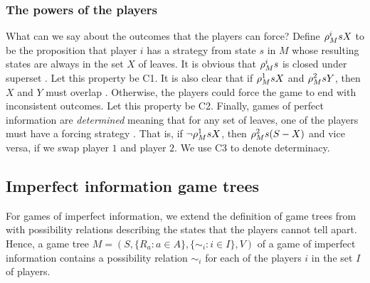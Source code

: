 \subsubsection*{The powers of the players}

What can we say about the outcomes that the players can force? Define $ \rho_{M}^{ i } s X $ to be the proposition that player $ i $ has a strategy from state $ s $ in $ M $ whose resulting states are always in the set $ X $ of leaves. It is obvious that $ \rho_{M}^{ i } s $ is closed under superset \cite{benthem2001a}. Let this property be C1. It is also clear that if $ \rho_{M}^{ 1 } s X $ and $ \rho_{M}^{ 2 } s Y $, then $ X $ and $ Y $ must overlap \cite{benthem2001a}. Otherwise, the players could force the game to end with inconsistent outcomes. Let this property be C2. Finally, games of perfect information are \emph{determined} meaning that for any set of leaves, one of the players must have a forcing strategy \cite{benthem2001a}. That is, if $ \neg \rho_{M}^{ 1 } s X $, then $ \rho_{M}^{ 2 } s (S - X) $ and vice versa, if we swap player $ 1 $ and player $ 2 $. We use C3 to denote determinacy. 



\subsection{Imperfect information game trees}

For games of imperfect information, we extend the definition of game trees from  with possibility relations describing the states that the players cannot tell apart. Hence, a game tree $ M = (S, \{ R_{a} : a \in A \}, \{ \sim_{i} : i \in I \}, V) $ of a game of imperfect information contains a possibility relation $ \sim_{i} $ for each of the players $ i $ in the set $ I $ of players.

